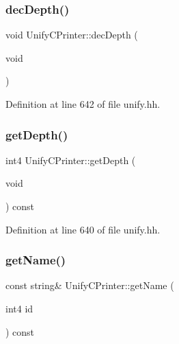 \mbox{\label{class_unify_c_printer_a62f5f9405bdb9590cf769be7d783590a}} 
\subsubsection{\texorpdfstring{decDepth()}{decDepth()}}
{\footnotesize\ttfamily void Unify\+C\+Printer\+::dec\+Depth (\begin{DoxyParamCaption}\item[{void}]{ }\end{DoxyParamCaption})\hspace{0.3cm}{\ttfamily [inline]}}



Definition at line 642 of file unify.\+hh.

\mbox{\label{class_unify_c_printer_a0d3dd056d885f2a7f507f1473df176cf}} 
\subsubsection{\texorpdfstring{getDepth()}{getDepth()}}
{\footnotesize\ttfamily int4 Unify\+C\+Printer\+::get\+Depth (\begin{DoxyParamCaption}\item[{void}]{ }\end{DoxyParamCaption}) const\hspace{0.3cm}{\ttfamily [inline]}}



Definition at line 640 of file unify.\+hh.

\mbox{\label{class_unify_c_printer_ac85d475e36aad222fc9a96402665475f}} 
\subsubsection{\texorpdfstring{getName()}{getName()}}
{\footnotesize\ttfamily const string\& Unify\+C\+Printer\+::get\+Name (\begin{DoxyParamCaption}\item[{int4}]{id }\end{DoxyParamCaption}) const\hspace{0.3cm}{\ttfamily [inline]}}



